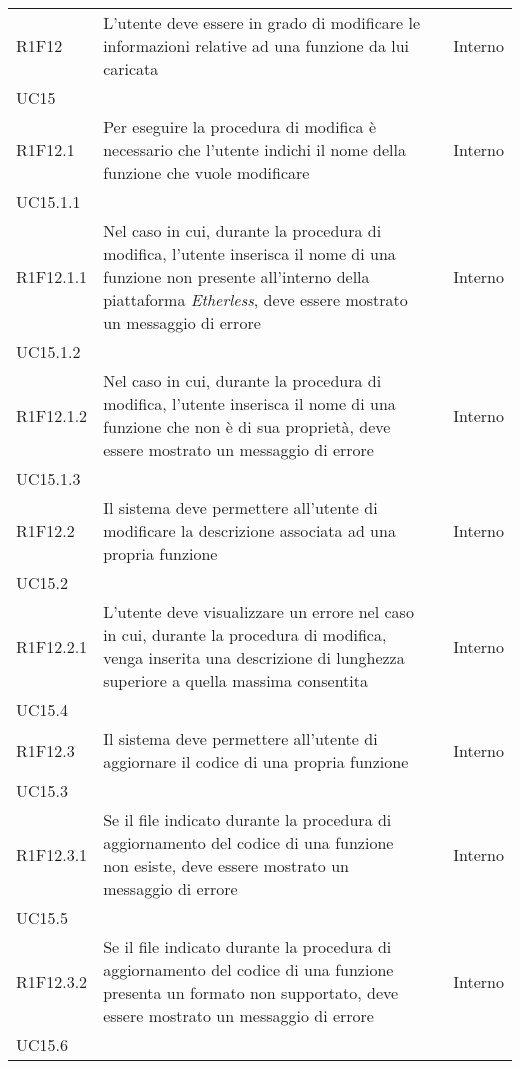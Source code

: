 \begin{longtable}{ 
		>{\centering}p{} 
		>{}p{} 
		>{\centering}p{}
		>{\centering}p{} }
	R1F12 & L'utente deve essere in grado di modificare le informazioni relative 
		ad una funzione da lui caricata 											& \ob & Interno \\ UC15 \tabularnewline
	R1F12.1 & Per eseguire la procedura di modifica è necessario che l'utente 
		indichi il nome della funzione che vuole modificare 						& \ob & Interno \\ UC15.1.1 \tabularnewline
	R1F12.1.1 & Nel caso in cui, durante la procedura di modifica, l'utente 
		inserisca il nome di una funzione non presente all'interno della piattaforma
		\textit{Etherless}, deve essere mostrato un messaggio di errore				& \ob & Interno \\ UC15.1.2 \tabularnewline
	R1F12.1.2 & Nel caso in cui, durante la procedura di modifica, l'utente 
		inserisca il nome di una funzione che non è di sua proprietà, deve essere 
		mostrato un messaggio di errore												& \ob & Interno \\ UC15.1.3 \tabularnewline
	R1F12.2 & Il sistema deve permettere all'utente di modificare la descrizione 
		associata ad una propria funzione 											& \ob & Interno \\ UC15.2 \tabularnewline
	R1F12.2.1 & L'utente deve visualizzare un errore nel caso in cui, durante 
		la procedura di modifica, venga inserita una descrizione di lunghezza
		superiore a quella massima consentita 										& \ob & Interno \\ UC15.4 \tabularnewline
	R1F12.3 & Il sistema deve permettere all'utente di aggiornare il codice di 
		una propria funzione 														& \ob & Interno \\ UC15.3 \tabularnewline	
	R1F12.3.1 & Se il file indicato durante la procedura di aggiornamento del 
		codice di una funzione non esiste, deve essere mostrato un messaggio di 
		errore																		& \ob & Interno \\ UC15.5 \tabularnewline
	R1F12.3.2 & Se il file indicato durante la procedura di aggiornamento del 
		codice di una funzione presenta un formato non supportato, deve 
		essere mostrato un messaggio di errore										& \ob & Interno \\ UC15.6 \tabularnewline  
		

\end{longtable}
